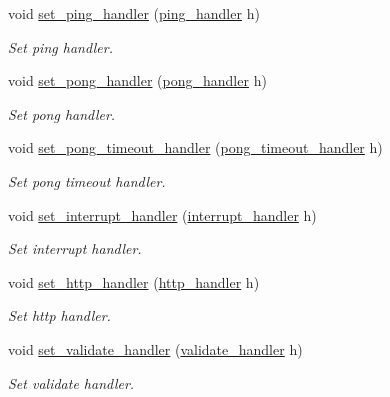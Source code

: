 \begin{DoxyCompactItemize}
void \mbox{\hyperlink{classwebsocketpp_1_1connection_a6e21e63abbbba88f818742e9da25fa8b}{set\+\_\+ping\+\_\+handler}} (\mbox{\hyperlink{namespacewebsocketpp_a9dcaaa7370865f1bcacb55ae715793ef}{ping\+\_\+handler}} h)
\begin{DoxyCompactList}\small\item\em Set ping handler. \end{DoxyCompactList}\item 
void \mbox{\hyperlink{classwebsocketpp_1_1connection_a298795eaa6d554ca5114ff23346d47a9}{set\+\_\+pong\+\_\+handler}} (\mbox{\hyperlink{namespacewebsocketpp_a1798d54e6d98a481cf870091af84bc1f}{pong\+\_\+handler}} h)
\begin{DoxyCompactList}\small\item\em Set pong handler. \end{DoxyCompactList}\item 
void \mbox{\hyperlink{classwebsocketpp_1_1connection_a6baa576fffc7af7685cf75894d634fb7}{set\+\_\+pong\+\_\+timeout\+\_\+handler}} (\mbox{\hyperlink{namespacewebsocketpp_a2c5925a111b9e553efebea35d5ea155f}{pong\+\_\+timeout\+\_\+handler}} h)
\begin{DoxyCompactList}\small\item\em Set pong timeout handler. \end{DoxyCompactList}\item 
void \mbox{\hyperlink{classwebsocketpp_1_1connection_aa8edc6e8ea1b72f84973bed0a20ad365}{set\+\_\+interrupt\+\_\+handler}} (\mbox{\hyperlink{namespacewebsocketpp_a55f6947df7673a9de3c44b6bd5d4a82a}{interrupt\+\_\+handler}} h)
\begin{DoxyCompactList}\small\item\em Set interrupt handler. \end{DoxyCompactList}\item 
void \mbox{\hyperlink{classwebsocketpp_1_1connection_a78c680623660b0442394af6b45c46c23}{set\+\_\+http\+\_\+handler}} (\mbox{\hyperlink{namespacewebsocketpp_a37bc4d5b3b21d3bb494d8a23236315d2}{http\+\_\+handler}} h)
\begin{DoxyCompactList}\small\item\em Set http handler. \end{DoxyCompactList}\item 
void \mbox{\hyperlink{classwebsocketpp_1_1connection_aa28096d051f5639d7b01954845fc054c}{set\+\_\+validate\+\_\+handler}} (\mbox{\hyperlink{namespacewebsocketpp_ae28f3fed86a59b1998746694f3d4edbd}{validate\+\_\+handler}} h)
\begin{DoxyCompactList}\small\item\em Set validate handler. \end{DoxyCompactList}\item 

\end{DoxyCompactItemize}
